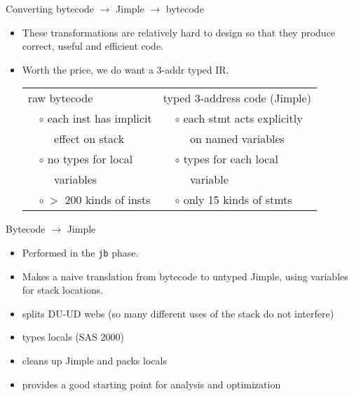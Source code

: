 \begin{slide}{Converting bytecode $\rightarrow$ Jimple $\rightarrow$ bytecode}
\begin{small}
\begin{itemize}
\item These transformations are relatively hard to design so that 
they produce correct, useful and efficient code.
\item Worth the price, we do want a 3-addr typed IR.
\begin{footnotesize}
\begin{tabular}{ll|ll}
\multicolumn{2}{l}{raw bytecode \hspace*{.7 in}} & \multicolumn{2}{l}{typed 3-address code (Jimple)}\\
& { $\circ$ each inst has implicit} & &{ $\circ$ each stmt acts explicitly} \\
& { $\quad $ effect on stack} & & { $\quad $ on named variables} \\
& { $\circ$ no types for local}  & & { $\circ$ types for each local} \\
& { $\quad$ variables}& & { $\quad $ variable} \\
& { $\circ \ >$ 200 kinds of insts} && { $\circ$ only 15 kinds of stmts} 
\end{tabular}
\end{footnotesize}
\end{itemize}
\end{small}
\end{slide}

\begin{slide} {Bytecode $\rightarrow$ Jimple}
\begin{itemize}
\item Performed in the \texttt{jb} phase.
\item Makes a naive translation from bytecode to untyped Jimple,
      using variables for stack locations.
\item splits DU-UD webs (so many different uses of the stack do not
      interfere)
\item types locals (SAS 2000)
\item cleans up Jimple and packs locals
\item provides a good starting point for analysis and optimization
\end{itemize}
\end{slide}

